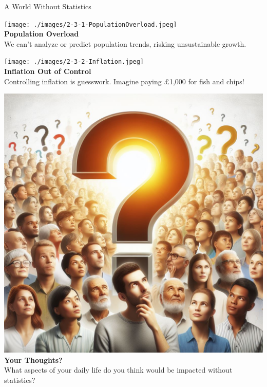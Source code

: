 \documentclass[final]{beamer}
\begin{document}
\begin{frame}[t]{}
\begin{columns}[t]
\begin{column}{.33\textwidth}
\begin{block}{A World Without Statistics}
				\begin{minipage}[t][0.3\textwidth][t]{0.3\textwidth}
					\centering
					\texttt{[image: ./images/2-3-1-PopulationOverload.jpeg]}\\
					\vspace{0.5cm}  
					\textbf{Population Overload}\\
					\small We can't analyze or predict population trends, risking unsustainable growth.
				\end{minipage}
				\hfill
				\begin{minipage}[t][0.33\textwidth][t]{0.33\textwidth}
					\centering
					\texttt{[image: ./images/2-3-2-Inflation.jpeg]}\\
					\vspace{0.5cm}  
					\textbf{Inflation Out of Control}\\
					\small Controlling inflation is guesswork. Imagine paying £1,000 for fish and chips!
				\end{minipage}
				\hfill
				\begin{minipage}[t][0.3\textwidth][t]{0.3\textwidth}
					\centering
					\includegraphics[width=0.7\linewidth]{./images/2-3-3-YourThoughts.jpeg}\\
					\vspace{0.5cm}
					\textbf{Your Thoughts?}\\
					\small What aspects of your daily life do you think would be impacted without statistics?
				\end{minipage}

				\vspace{2.92cm}
				
			\end{block}
			

\end{column}
\end{columns}
\end{frame}
\end{document}
